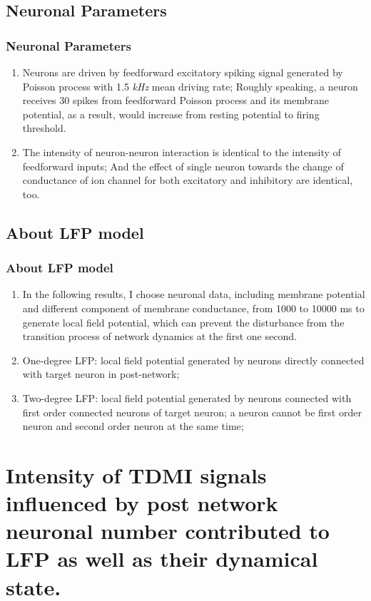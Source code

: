 \documentclass{beamer}
\begin{document}
	\subsection{Neuronal Parameters}
	\begin{frame}
		\frametitle{Neuronal Parameters}
		\begin{enumerate}
			\item Neurons are driven by feedforward excitatory spiking signal generated by Poisson process with 1.5 \emph{kHz} mean driving rate; Roughly speaking, a neuron receives 30 spikes from feedforward Poisson process and its membrane potential, as a result, would increase from resting potential to firing threshold.
			\item The intensity of neuron-neuron interaction is identical to the intensity of feedforward inputs; And the effect of single neuron towards the change of conductance of ion channel for both excitatory and inhibitory are identical, too.
		\end{enumerate}
	\end{frame}
	
	\subsection{About LFP model}
	\begin{frame}
	\frametitle{About LFP model}
		\begin{enumerate}[*]
			\item In the following results, I choose neuronal data, including membrane potential and different component of membrane conductance, from 1000 to 10000 ms to generate local field potential, which can prevent the disturbance from the transition process of network dynamics at the first one second.
			\item One-degree LFP: local field potential generated by neurons directly connected with target neuron in post-network;
			\item Two-degree LFP: local field potential generated by neurons connected with first order connected neurons of target neuron; a neuron cannot be first order neuron and second order neuron at the same time;
		\end{enumerate}
	\end{frame}

	\section{Intensity of TDMI signals influenced by post network neuronal number contributed to LFP as well as their dynamical state.}
\end{document}
